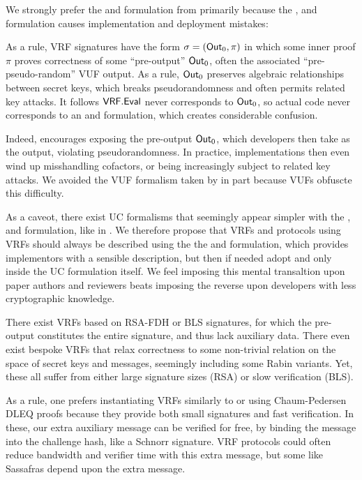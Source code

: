 We strongly prefer the \Sign and \Verify formulation from \cite{agg_dkg}
primarily because the , and 
formulation causes implementation and deployment mistakes:

As a rule, VRF signatures have the form $\sigma = ({\mathsf{Out}}_0,\pi)$ in which
some inner proof $\pi$ proves correctness of some ``pre-output'' ${\mathsf{Out}}_0$,
 often the associated ``pre-pseudo-random'' VUF output.
As a rule, ${\mathsf{Out}}_0$ preserves algebraic relationships between secret keys,
 which breaks pseudorandomness and often permits related key attacks.
It follows ${\mathsf{VRF}}.{\mathsf{Eval}}$ never corresponds to ${\mathsf{Out}}_0$, so actual code never
corresponds to an  and  formulation,
 which creates considerable confusion.

Indeed,  encourages exposing the pre-output ${\mathsf{Out}}_0$,
which developers then take as the output, violating pseudorandomness. 
In practice, implementations then even wind up misshandling cofactors,
 or being increasingly subject to related key attacks.
We avoided the VUF formalism taken by \cite{agg_dkg} in part because VUFs obfuscte this difficulty.

As a caveot, there exist UC formalisms that seemingly appear simpler
with the , and  formulation,
like in \cite{praos}.
We therefore propose that VRFs and protocols using VRFs should always be
described using the the \Sign and \Verify formulation, which provides
implementors with a sensible description, but then if needed adopt
  and  only inside the UC formulation itself.
We feel imposing this mental transaltion upon paper authors and reviewers
 beats imposing the reverse upon developers with less cryptographic knowledge.

\smallskip

There exist VRFs based on RSA-FDH or BLS signatures, for which the
pre-output constitutes the entire signature, and thus lack auxiliary data. 
There even exist bespoke VRFs that relax correctness to some non-trivial
relation on the space of secret keys and messages,
 seemingly including some Rabin variants. 
Yet, these all suffer from either large signature sizes (RSA) or
 slow verification (BLS).

As a rule, one prefers instantiating VRFs similarly to
 \cite{nsec5} or \cite{VXEd25519} using Chaum-Pedersen DLEQ proofs \cite{CP93}
 because they provide both small signatures and fast verification.
In these, our extra auxiliary message \aux can be verified for free,
by binding the message into the challenge hash, like a Schnorr signature.
VRF protocols could often reduce bandwidth and verifier time with
this extra message, but some like Sassafras depend upon the extra message.



